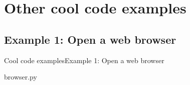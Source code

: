 \documentclass[10pt,compress]{beamer} %
\begin{document}
\section{Other cool code examples}

\subsection{Example 1: Open a web browser}
\begin{frame}{Cool code examples}{Example 1: Open a web browser}
	\vspace{-0.2cm}
	\begin{exampleblock}{browser.py}
	\vspace{-0.2cm}
	
	\vspace{-0.2cm}
	\end{exampleblock}
\end{frame}
\end{document}
